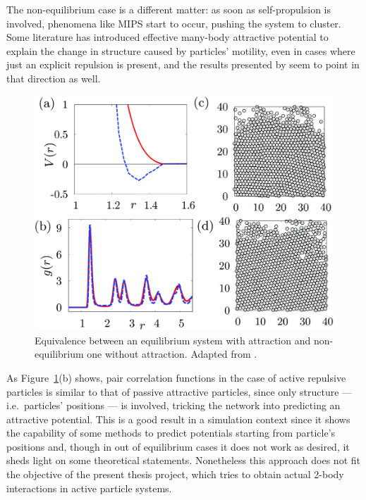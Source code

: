 \documentclass[../../master_thesis_np.tex]{subfiles}
\begin{document}
	The non-equilibrium case is a different matter: as soon as self-propulsion is involved, phenomena like MIPS start to occur, pushing the system to cluster. 
	Some literature has introduced effective many-body attractive potential to explain the change in structure caused by particles' motility, even in cases where just an explicit repulsion is present, and the results presented by \citeauthor{bag_interaction_2021} seem to point in that direction as well. 
 	\begin{figure}[htp]
		\centering
		\includegraphics[width=\singfigwidth]{bag2.png}
		\caption{Equivalence between an equilibrium system with attraction and non-equilibrium one without attraction. Adapted from \cite{bag_interaction_2021}.}
		\label{fig:bag2}
	\end{figure}
	As Figure~\ref{fig:bag2}(b) shows, pair correlation functions in the case of active repulsive particles is similar to that of passive attractive particles, since only structure --- i.e.\ particles' positions --- is involved, tricking the network into predicting an attractive potential. 
	This is a good result in a simulation context since it shows the capability of some methods to predict potentials starting from particle's positions and, though in out of equilibrium cases it does not work as desired, it sheds light on some theoretical statements. 
	Nonetheless this approach does not fit the objective of the present thesis project, which tries to obtain actual 2-body interactions in active particle systems. 
	
\end{document}
